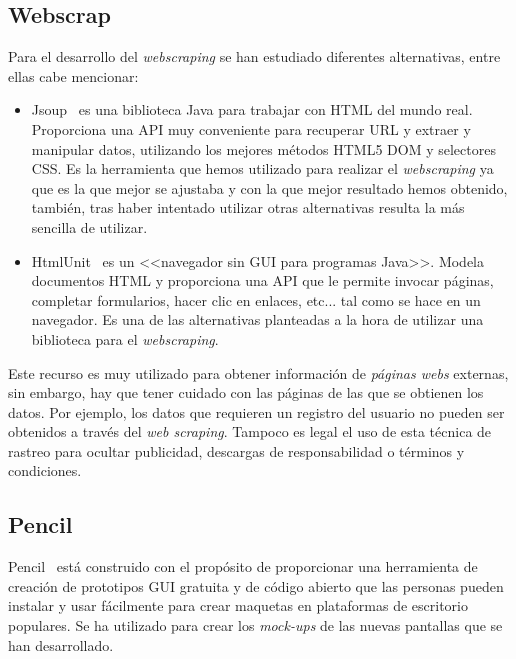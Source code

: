 \subsection{Webscrap}
Para el desarrollo del \emph{webscraping} se han estudiado diferentes alternativas, entre ellas cabe mencionar:
\begin{itemize}
	
\item Jsoup~\cite{jsoup} es una biblioteca Java para trabajar con HTML del mundo real. Proporciona una API muy conveniente para recuperar URL y extraer y manipular datos, utilizando los mejores métodos HTML5 DOM y selectores CSS. 
Es la herramienta que hemos utilizado para realizar el \emph{webscraping} ya que es la que mejor se ajustaba y con la que mejor resultado hemos obtenido, también, tras haber intentado utilizar otras alternativas resulta la más sencilla de utilizar.


\item HtmlUnit~\cite{HTMLUNIT} es un <<navegador sin GUI para programas Java>>. Modela documentos HTML y proporciona una API que le permite invocar páginas, completar formularios, hacer clic en enlaces, etc... tal como se hace en un navegador. 
Es una de las alternativas planteadas a la hora de utilizar una biblioteca para el \emph{webscraping}.

\end{itemize}
Este recurso es muy utilizado para obtener información de \emph{páginas webs} externas, sin embargo, hay que tener cuidado con las páginas de las que se obtienen los datos. Por ejemplo, los datos que requieren un registro del usuario no pueden ser obtenidos a través del \emph{web scraping}.
Tampoco es legal el uso de esta técnica de rastreo para ocultar publicidad, descargas de responsabilidad o términos y condiciones.~\cite{webScrap}

\subsection{Pencil}
Pencil~\cite{Pencil_project} está construido con el propósito de proporcionar una herramienta de creación de prototipos GUI gratuita y de código abierto que las personas pueden instalar y usar fácilmente para crear maquetas en plataformas de escritorio populares. 
Se ha utilizado para crear los \emph{mock-ups} de las nuevas pantallas que se han desarrollado.

